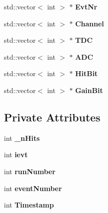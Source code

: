\begin{DoxyCompactItemize}
\item 
std\-::vector$<$ int $>$ $\ast$ {\bfseries Evt\-Nr}\label{classCALICE_1_1RootTreeGeneratorEUDAQ2016_abadc209886e81c7bfa3aa2b73b815bf0}

\item 
std\-::vector$<$ int $>$ $\ast$ {\bfseries Channel}\label{classCALICE_1_1RootTreeGeneratorEUDAQ2016_af1824afeb2b1ffa825bb3ddd14722ef7}

\item 
std\-::vector$<$ int $>$ $\ast$ {\bfseries T\-D\-C}\label{classCALICE_1_1RootTreeGeneratorEUDAQ2016_a170d726c9f6d8398973511c3b6e81319}

\item 
std\-::vector$<$ int $>$ $\ast$ {\bfseries A\-D\-C}\label{classCALICE_1_1RootTreeGeneratorEUDAQ2016_af43d4395913a19fa1ef34e276bf99f41}

\item 
std\-::vector$<$ int $>$ $\ast$ {\bfseries Hit\-Bit}\label{classCALICE_1_1RootTreeGeneratorEUDAQ2016_a01b238a4a713eb52c946feac98056bcf}

\item 
std\-::vector$<$ int $>$ $\ast$ {\bfseries Gain\-Bit}\label{classCALICE_1_1RootTreeGeneratorEUDAQ2016_a32a8146a291432eb23487db37c41a110}

\end{DoxyCompactItemize}
\subsection*{Private Attributes}
\begin{DoxyCompactItemize}
\item 
int {\bfseries \-\_\-n\-Hits}\label{classCALICE_1_1RootTreeGeneratorEUDAQ2016_a735601e0c7ba867dd33220b67fdac246}

\item 
int {\bfseries ievt}\label{classCALICE_1_1RootTreeGeneratorEUDAQ2016_a7a5b38d420f5c9bbffebed4a12fbc686}

\item 
int {\bfseries run\-Number}\label{classCALICE_1_1RootTreeGeneratorEUDAQ2016_a9fa143e155360b6f645d0b19f5e83efa}

\item 
int {\bfseries event\-Number}\label{classCALICE_1_1RootTreeGeneratorEUDAQ2016_a87e4a3f01d9619d80dee5e3ce99e4bd3}

\item 
int {\bfseries Timestamp}\label{classCALICE_1_1RootTreeGeneratorEUDAQ2016_a9559dfea2413851744d5aa51f0634b25}

\end{DoxyCompactItemize}
